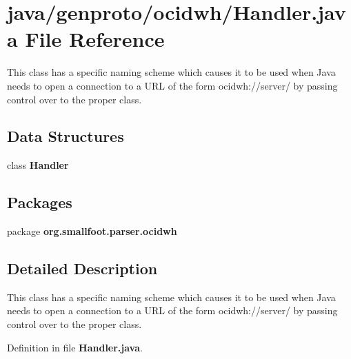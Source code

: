 \section{java/genproto/ocidwh/\+Handler.java File Reference}
\label{ocidwh_2Handler_8java}


This class has a specific naming scheme which causes it to be used when Java needs to open a connection to a U\+R\+L of the form ocidwh\+://server/ by passing control over to the proper class.  


\subsection*{Data Structures}
\begin{DoxyCompactItemize}
\item 
class {\bf Handler}
\end{DoxyCompactItemize}
\subsection*{Packages}
\begin{DoxyCompactItemize}
\item 
package {\bf org.\+smallfoot.\+parser.\+ocidwh}
\end{DoxyCompactItemize}


\subsection{Detailed Description}
This class has a specific naming scheme which causes it to be used when Java needs to open a connection to a U\+R\+L of the form ocidwh\+://server/ by passing control over to the proper class. 



Definition in file {\bf Handler.\+java}.

